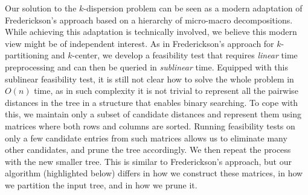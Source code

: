 \documentclass[11pt,a4paper]{article}
\theoremstyle{definition}
\theoremstyle{remark}
\begin{document}
 
\vspace{0.04in} 
Our solution to the $k$-dispersion problem can be seen as a modern adaptation of Frederickson's approach based on a hierarchy of micro-macro decompositions. While achieving this adaptation is technically involved, we believe this modern view might be of independent interest. As in Frederickson's approach for $k$-partitioning and $k$-center, we develop a feasibility test that requires {\em linear} time preprocessing and can then be queried in \emph{sublinear} time.
Equipped with this sublinear feasibility test, it is still not clear how to solve the whole problem in $O(n)$ time, as in such complexity it is not trivial to represent all the pairwise distances in the tree in a structure that enables binary searching. To cope with this, we maintain only a subset of candidate distances and represent them using matrices where both rows and columns are sorted. Running feasibility tests on only a few candidate entries from such matrices allows us to eliminate many other candidates, and prune the tree accordingly. We then repeat the process with the new smaller tree.
This is similar to Frederickson's approach, but our algorithm (highlighted below) differs in how we construct these matrices,  in how we partition the input tree, and in how we prune it. 
\end{document}
